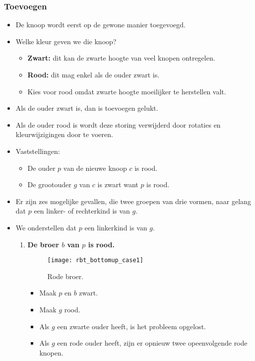 \subsubsection{Toevoegen}
\begin{itemize}
    \item De knoop wordt eerst op de gewone manier toegevoegd.
    \item Welke kleur geven we die knoop?
    \begin{itemize}
        \item \textbf{Zwart:} dit kan de zwarte hoogte van veel knopen ontregelen.
        \item \textbf{Rood:} dit mag enkel als de ouder zwart is.
        \item Kies voor rood omdat zwarte hoogte moeilijker te herstellen valt.
    \end{itemize}
    \item Als de ouder zwart is, dan is toevoegen gelukt.
    \item Als de ouder rood is wordt deze storing verwijderd door rotaties en kleurwijzigingen door te voeren.
    \item Vaststellingen:
    \begin{itemize}
        \item De ouder $p$ van de nieuwe knoop $c$ is rood.
        \item De grootouder $g$ van $c$ is zwart want $p$ is rood.
    \end{itemize}
    \item Er zijn zes mogelijke gevallen, die twee groepen van drie vormen, naar gelang dat $p$ een linker- of rechterkind is van $g$. 
    \item We onderstellen dat $p$ een linkerkind is van $g$. 
    \begin{enumerate}
        \item \textbf{De broer $b$ van $p$ is rood.}
        \begin{figure}[ht]
            \centering
            \texttt{[image: rbt\_bottomup\_case1]}
            \caption{Rode broer.}
            \label{fig:rbt_bottomup_case1}
        \end{figure}
        \begin{itemize}
            \item Maak $p$ en $b$ zwart.
            \item Maak $g$ rood.
            \item Als $g$ een zwarte ouder heeft, is het probleem opgelost.
            \item Als $g$ een rode ouder heeft, zijn er opnieuw twee opeenvolgende rode knopen.

\end{itemize}
\end{enumerate}
\end{itemize}
